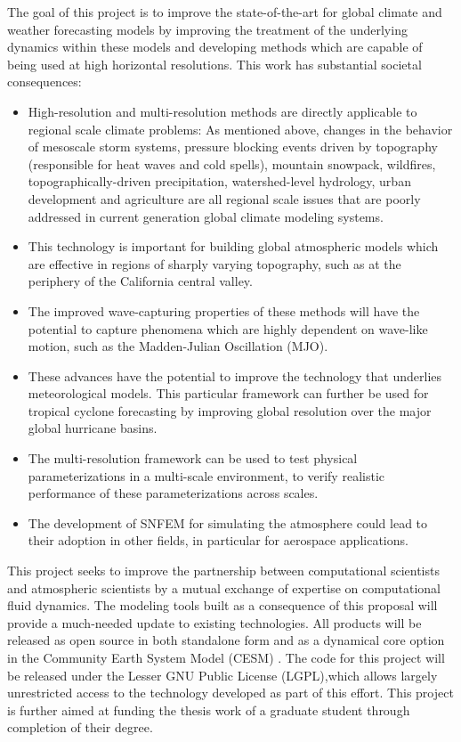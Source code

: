 \documentclass[11pt]{article}
\begin{document}
The goal of this project is to improve the state-of-the-art for global climate and weather forecasting models by improving the treatment of the underlying dynamics within these models and developing methods which are capable of being used at high horizontal resolutions.  This work has substantial societal consequences:
\vspace{-0.4cm}
\begin{itemize}
\item High-resolution and multi-resolution methods are directly applicable to regional scale climate problems: As mentioned above, changes in the behavior of mesoscale storm systems, pressure blocking events driven by topography (responsible for heat waves and cold spells), mountain snowpack, wildfires, topographically-driven precipitation, watershed-level hydrology, urban development and agriculture are all regional scale issues that are poorly addressed in current generation global climate modeling systems.
\item This technology is important for building global atmospheric models which are effective in regions of sharply varying topography, such as at the periphery of the California central valley.
\item The improved wave-capturing properties of these methods will have the potential to capture phenomena which are highly dependent on wave-like motion, such as the Madden-Julian Oscillation (MJO).
\item These advances have the potential to improve the technology that underlies meteorological models.  This particular framework can further be used for tropical cyclone forecasting by improving global resolution over the major global hurricane basins.
\item The multi-resolution framework can be used to test physical parameterizations in a multi-scale environment, to verify realistic performance of these parameterizations across scales.
\item The development of SNFEM for simulating the atmosphere could lead to their adoption in other fields, in particular for aerospace applications.
\end{itemize}
\vspace{-0.4cm}
This project seeks to improve the partnership between computational scientists and atmospheric scientists by a mutual exchange of expertise on computational fluid dynamics.  The modeling tools built as a consequence of this proposal will provide a much-needed update to existing technologies.  All products will be released as open source in both standalone form and as a dynamical core option in the Community Earth System Model (CESM) \citep{JWHetal2013BAMS}.  The code for this project will be released under the Lesser GNU Public License (LGPL),which allows largely unrestricted access to the technology developed as part of this effort.  This project is further aimed at funding the thesis work of a graduate student through completion of their degree.
\end{document}
